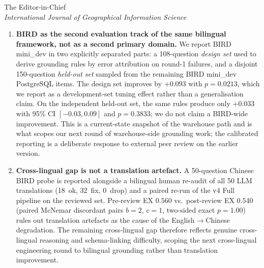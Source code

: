 \documentclass[11pt]{letter}
\begin{document}
\begin{letter}{The Editor-in-Chief \\ \emph{International Journal of Geographical Information Science}}
\begin{enumerate}
\item \textbf{BIRD as the second evaluation track of the same bilingual framework, not as a second primary domain.} We report BIRD mini\_dev in two explicitly separated parts: a 108-question \emph{design set} used to derive grounding rules by error attribution on round-1 failures, and a disjoint 150-question \emph{held-out set} sampled from the remaining BIRD mini\_dev PostgreSQL items. The design set improves by $+0.093$ with $p=0.0213$, which we report as a development-set tuning effect rather than a generalisation claim. On the independent held-out set, the same rules produce only $+0.033$ with 95\% CI $[-0.03, 0.09]$ and $p=0.3833$; we do not claim a BIRD-wide improvement. This is a current-state snapshot of the warehouse path and is what scopes our next round of warehouse-side grounding work; the calibrated reporting is a deliberate response to external peer review on the earlier version.

\item \textbf{Cross-lingual gap is not a translation artefact.} A 50-question Chinese BIRD probe is reported alongside a bilingual human re-audit of all 50 LLM translations (18~ok, 32~fix, 0~drop) and a paired re-run of the v4 Full pipeline on the reviewed set. Pre-review EX $0.560$ vs.\ post-review EX $0.540$ (paired McNemar discordant pairs $b=2$, $c=1$, two-sided exact $p=1.00$) rules out translation artefacts as the cause of the English$\to$Chinese degradation. The remaining cross-lingual gap therefore reflects genuine cross-lingual reasoning and schema-linking difficulty, scoping the next cross-lingual engineering round to bilingual grounding rather than translation improvement.
\end{enumerate}


\end{letter}
\end{document}
